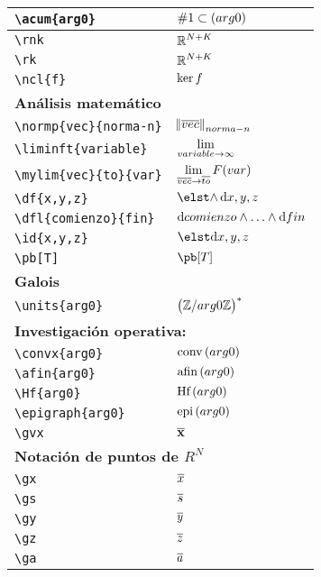 \begin{longtable}{|p{3.5cm}|p{2cm}|}
\verb|\acum{arg0}| & $\displaystyle\acum{arg0}$ \\ \midrule 
\verb|\rnk| & $\displaystyle\mathbb{R}^{N+K}$ \\ \midrule 
\verb|\rk| & $\displaystyle\mathbb{R}^{N+K}$ \\ \midrule 
\verb|\ncl{f}| & $\displaystyle\ker f$ \\ \midrule 
\bottomrule \multicolumn{2}{|p{5.5cm}|}{\textbf{Análisis matemático}} \\ \toprule 
\verb|\normp{vec}{norma-n}| & $\displaystyle\norm{\overline{vec}}_{norma-n}$ \\ \midrule 
\verb|\liminft{variable}| & $\displaystyle\lim_{{variable}\rightarrow \infty}$ \\ \midrule 
\verb|\mylim{vec}{to}{var}| & $\displaystyle\lim_{\overline{vec} \rightarrow \overline{to}} F({var})$ \\ \midrule 
\verb|\df{x,y,z}| & $\displaystyle\df{x,y,z}$ \\ \midrule 
\verb|\dfl{comienzo}{fin}| & $\displaystyle\operatorname{d\!}{} comienzo \wedge \dotsc \wedge \operatorname{d\!}{} fin$ \\ \midrule 
\verb|\id{x,y,z}| & $\displaystyle\id{x,y,z}$ \\ \midrule 
\verb|\pb[T]| & $\displaystyle\pb[T]$ \\ \midrule 
\bottomrule \multicolumn{2}{|p{5.5cm}|}{\textbf{Galois}} \\ \toprule 
\verb|\units{arg0}| & $\displaystyle\left(\mathbb{Z}/{arg0}\mathbb{Z}\right)^*$ \\ \midrule 
\bottomrule \multicolumn{2}{|p{5.5cm}|}{\textbf{Investigación operativa:}} \\ \toprule 
\verb|\convx{arg0}| & $\displaystyle\mbox{conv}\left(arg0\right)$ \\ \midrule 
\verb|\afin{arg0}| & $\displaystyle\mbox{afin}\left(arg0\right)$ \\ \midrule 
\verb|\Hf{arg0}| & $\displaystyle\mbox{Hf}\left(arg0\right)$ \\ \midrule 
\verb|\epigraph{arg0}| & $\displaystyle\mbox{epi}\left(arg0\right)$ \\ \midrule 
\verb|\gvx| & $\displaystyle\overline{\bold{x}}$ \\ \midrule 
\bottomrule \multicolumn{2}{|p{5.5cm}|}{\textbf{Notación de puntos de $R^N$}} \\ \toprule 
\verb|\gx| & $\displaystyle\overline{x}$ \\ \midrule 
\verb|\gs| & $\displaystyle\overline{s}$ \\ \midrule 
\verb|\gy| & $\displaystyle\overline{y}$ \\ \midrule 
\verb|\gz| & $\displaystyle\overline{z}$ \\ \midrule 
\verb|\ga| & $\displaystyle\overline{a}$ \\ \midrule 

\end{longtable}
